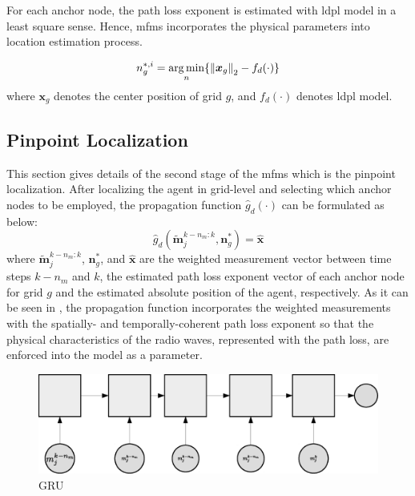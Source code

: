     For each anchor node, the path loss exponent is estimated with \gls{ldpl} model in a least square sense.
    Hence, \gls{mfms} incorporates the physical parameters into location estimation process.

    \begin{equation}
        n^{*,i}_g = \operatorname*{arg\,min}_n\{ \left\lVert\bm{x}_g\right\rVert_2 - f_d(\cdot)\}
    \end{equation}
    where $\bm{x}_g$ denotes the center position of grid $g$, and $f_d(\cdot)$ denotes \gls{ldpl} model.

    \subsection{Pinpoint Localization}
    This section gives details of the second stage of the \gls{mfms} which is the pinpoint localization.
    After localizing the agent in grid-level and selecting which anchor nodes to be employed, the propagation function $\hat{g}_d(\cdot)$ can be formulated as below:
    \begin{equation}
        \label{eq:propfunct}
        \hat{g}_d(\bm{\widetilde{m}}^{k-n_{m}:k}_j, \bm{n}^*_g)= \bm{\hat{x}}
    \end{equation}
    where $\bm{\widetilde{m}}^{k-n_{m}:k}_j$, $\bm{n}^*_g$, and $\bm{\hat{x}}$ are the weighted measurement vector between time steps $k-n_m$ and $k$, the estimated path loss exponent vector of each anchor node for grid $g$ and the estimated absolute position of the agent, respectively.
    As it can be seen in , the propagation function incorporates the weighted measurements with the spatially- and temporally-coherent path loss exponent so that the physical characteristics of the radio waves, represented with the path loss, are enforced into the model as a parameter.

    \begin{figure}[thpb]
       \centering
       \includegraphics[width=\linewidth]{figures/gru.eps}
       \caption{\label{fig:gru}GRU}
    \end{figure}

